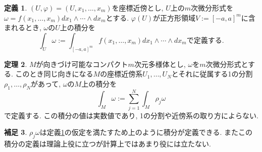 \documentclass[dvipdfmx,a4paper,11pt]{article}
\theoremstyle{definition}
\newtheorem{thm}{定理}
\newtheorem{dfn}[thm]{定義}
\newtheorem{rem}[thm]{補足}
\begin{document}
 
  \begin{tcolorbox}[
    colback = white,
    colframe = green!35!black,
    fonttitle = \bfseries,
    breakable = true]
\begin{dfn}
\label{integral_local}
$(U, \varphi) = (U, x_1, \ldots, x_m)$を座標近傍とし, $U$上の$m$次微分形式を$\omega = f(x_1, \ldots, x_m)dx_1 \wedge \cdots \wedge dx_m$とする.
$\varphi(U)$が正方形領域$V:=[-a,a]^{m}$に含まれるとき, $\omega$の$U$上の積分を
$$
\int_{U} \omega := \int_{[-a,a]^{m}}f(x_1, \ldots, x_m)dx_1 \wedge \cdots \wedge dx_m
\text{で定義する.}
$$
    \end{dfn}
    \end{tcolorbox} 
    


  \begin{tcolorbox}[
    colback = white,
    colframe = green!35!black,
    fonttitle = \bfseries,
    breakable = true]
\begin{thm}
$M$が向きづけ可能なコンパクト$m$次元多様体とし, $\omega$を$m$次微分形式とする.
このとき同じ向きになる$M$の座標近傍系$U_1, \ldots, U_N$とそれに従属する1の分割$\rho_{1}, \ldots, \rho_{N}$があって,
$\omega$の$M$上の積分を
$$
\int_{M} \omega := \sum_{j=1}^{N} \int_{M} \rho_j \omega
$$
で定義する. この積分の値は実数値であり, 1の分割や近傍系の取り方によらない. 
    \end{thm}
    \end{tcolorbox} 

\begin{rem}
 $\rho_j \omega$は定義\ref{integral_local}の仮定を満たすため上のように積分が定義できる. 
 またこの積分の定義は理論上役に立つが計算上ではあまり役には立たない. 
\end{rem}
\end{document}
